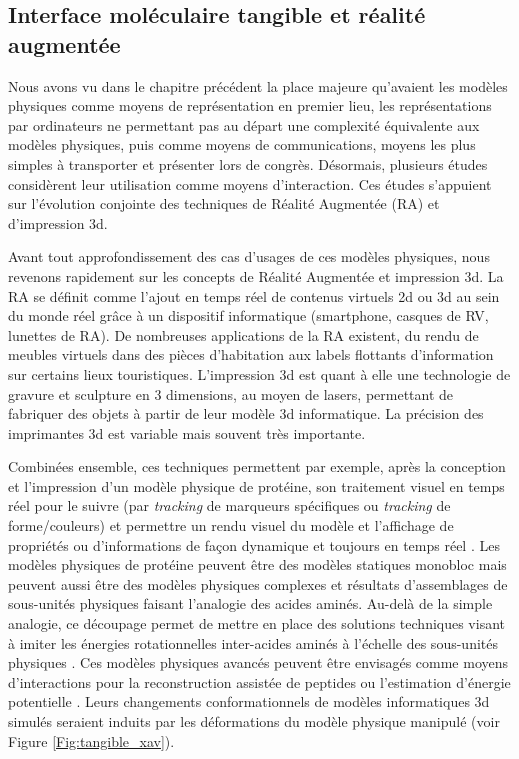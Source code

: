 \subsection{Interface moléculaire tangible et réalité augmentée}

Nous avons vu dans le chapitre précédent la place majeure qu'avaient les modèles physiques comme moyens de représentation en premier lieu, les représentations par ordinateurs ne permettant pas au départ une complexité équivalente aux modèles physiques, puis comme moyens de communications, moyens les plus simples à transporter et présenter lors de congrès. Désormais, plusieurs études considèrent leur utilisation comme moyens d'interaction. Ces études s'appuient sur l'évolution conjointe des techniques de Réalité Augmentée (RA) et d'impression 3d. 

Avant tout approfondissement des cas d'usages de ces modèles physiques, nous revenons rapidement sur les concepts de Réalité Augmentée et impression 3d. La RA se définit comme l'ajout en temps réel de contenus virtuels 2d ou 3d au sein du monde réel grâce à un dispositif informatique (smartphone, casques de RV, lunettes de RA). De nombreuses applications de la RA existent, du rendu de meubles virtuels dans des pièces d'habitation aux labels flottants d'information sur certains lieux touristiques. 
L'impression 3d est quant à elle une technologie de gravure et sculpture en 3 dimensions, au moyen de lasers, permettant de fabriquer des objets à partir de leur modèle 3d informatique. La précision des imprimantes 3d est variable mais souvent très importante. 

Combinées ensemble, ces techniques permettent par exemple, après la conception et l'impression d'un modèle physique de protéine, son traitement visuel en temps réel pour le suivre (par \textit{tracking} de marqueurs spécifiques ou \textit{tracking} de forme/couleurs) et permettre un rendu visuel du modèle et l'affichage de propriétés ou d'informations de façon dynamique et toujours en temps réel \cite{gillet2005tangible}. 
Les modèles physiques de protéine peuvent être des modèles statiques monobloc mais peuvent aussi être des modèles physiques complexes et résultats d'assemblages de sous-unités physiques faisant l'analogie des acides aminés. Au-delà de la simple analogie, ce découpage permet de mettre en place des solutions techniques visant à imiter les énergies rotationnelles inter-acides aminés à l'échelle des sous-unités physiques \cite{chakraborty2013coarse}. Ces modèles physiques avancés peuvent être envisagés comme moyens d'interactions pour la reconstruction assistée de peptides ou l'estimation d'énergie potentielle \cite{martinez2015virtual}. Leurs changements conformationnels de modèles informatiques 3d simulés seraient induits par les déformations du modèle physique manipulé (voir Figure \ref{Fig:tangible_xav}).

